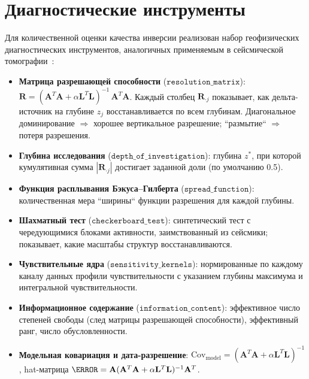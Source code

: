 \documentclass[12pt,a4paper]{article}
\newcommand{\mA}{\mathbf{A}}
\newcommand{\mL}{\mathbf{L}}
\newcommand{\mR}{\mathbf{R}}
\begin{document}
\section{Диагностические инструменты}
\label{sec:diagnostics}

Для количественной оценки качества инверсии реализован
набор геофизических диагностических инструментов,
аналогичных применяемым в сейсмической томографии~\citep{Menke2018,
Backus1968}:

\begin{itemize}[leftmargin=*,itemsep=3pt]
  \item \textbf{Матрица разрешающей способности}
        ($\texttt{resolution\_matrix}$):
        $\mR = (\mA^T\mA + \alpha\mL^T\mL)^{-1}\,\mA^T\mA$.
        Каждый столбец $\mR_{\cdot j}$ показывает, как дельта-источник
        на глубине $z_j$ восстанавливается по всем глубинам.
        Диагональное доминирование $\Rightarrow$ хорошее вертикальное
        разрешение; ``размытие`` $\Rightarrow$ потеря разрешения.

  \item \textbf{Глубина исследования} ($\texttt{depth\_of\_investigation}$):
        глубина $z^*$, при которой кумулятивная сумма $|\mR_{\cdot j}|$
        достигает заданной доли (по умолчанию 0.5).

  \item \textbf{Функция расплывания Бэкуса--Гилберта}
        ($\texttt{spread\_function}$):
        количественная мера ``ширины`` функции разрешения
        для каждой глубины.

  \item \textbf{Шахматный тест} ($\texttt{checkerboard\_test}$):
        синтетический тест с чередующимися блоками активности,
        заимствованный из сейсмики; показывает, какие масштабы
        структур восстанавливаются.

  \item \textbf{Чувствительные ядра} ($\texttt{sensitivity\_kernels}$):
        нормированные по каждому каналу данных профили
        чувствительности с указанием глубины максимума
        и интегральной чувствительности.

  \item \textbf{Информационное содержание} ($\texttt{information\_content}$):
        эффективное число степеней свободы (след матрицы
        разрешающей способности), эффективный ранг,
        число обусловленности.

  \item \textbf{Модельная ковариация и дата-разрешение}:
        $\mathrm{Cov}_{\mathrm{model}} = (\mA^T\mA + \alpha\mL^T\mL)^{-1}$,
        hat-матрица $\mH = \mA(\mA^T\mA + \alpha\mL^T\mL)^{-1}\mA^T$.
\end{itemize}
\end{document}
